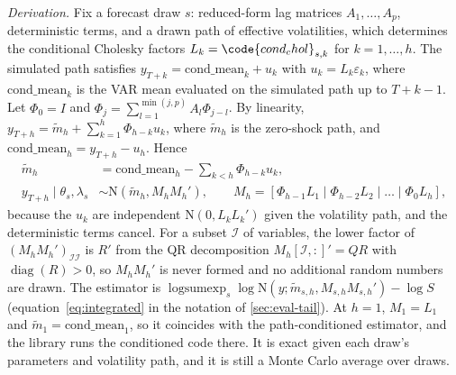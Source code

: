 \emph{Derivation.}
Fix a forecast draw $s$: reduced-form lag matrices $A_1, \dots, A_p$, deterministic terms, and a
drawn path of effective volatilities, which determines the conditional Cholesky factors $L_k =
\code{cond_chol}_{s,k}$ for $k = 1, \dots, h$.
The simulated path satisfies $y_{T+k} = \mathrm{cond\_mean}_k + u_k$ with $u_k = L_k\varepsilon_k$,
where $\mathrm{cond\_mean}_k$ is the VAR mean evaluated on the simulated path up to $T + k - 1$.
Let $\Phi_0 = I$ and $\Phi_j = \sum_{l=1}^{\min(j,p)} A_l\Phi_{j-l}$.
By linearity, $y_{T+h} = \tilde m_h + \sum_{k=1}^{h}\Phi_{h-k}u_k$, where $\tilde m_h$ is the
zero-shock path, and $\mathrm{cond\_mean}_h = y_{T+h} - u_h$.
Hence
\begin{equation}\label{eq:B-integrated}
\begin{aligned}
\tilde m_h &= \mathrm{cond\_mean}_h - \sum_{k<h}\Phi_{h-k}u_k, \\
y_{T+h} \mid \theta_s, \lambda_s &\sim \mathrm{N}(\tilde m_h, M_h M_h'), \qquad
M_h = [\Phi_{h-1}L_1 \mid \Phi_{h-2}L_2 \mid \dots \mid \Phi_0 L_h],
\end{aligned}
\end{equation}
because the $u_k$ are independent $\mathrm{N}(0, L_kL_k')$ given the volatility path, and the
deterministic terms cancel.
For a subset $\mathcal{I}$ of variables, the lower factor of $(M_hM_h')_{\mathcal{I}\mathcal{I}}$ is
$R'$ from the QR decomposition $M_h[\mathcal{I}, :]' = QR$ with $\operatorname{diag}(R) > 0$, so
$M_hM_h'$ is never formed and no additional random numbers are drawn.
The estimator is $\operatorname{logsumexp}_s \log\mathrm{N}(y; \tilde m_{s,h}, M_{s,h}M_{s,h}') - \log S$
(equation~\eqref{eq:integrated} in the notation of \cref{sec:eval-tail}).
At $h = 1$, $M_1 = L_1$ and $\tilde m_1 = \mathrm{cond\_mean}_1$, so it coincides with the path-conditioned
estimator, and the library runs the conditioned code there.
It is exact given each draw's parameters and volatility path, and it is still a Monte Carlo average
over draws.
